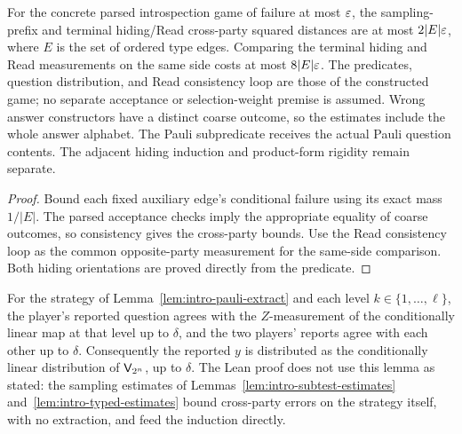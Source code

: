 \begin{lemma}
\label{lem:intro-typed-estimates}
\leanok
For the concrete parsed introspection game of failure at most $\varepsilon$, the
sampling-prefix and terminal hiding/Read cross-party squared distances are
at most $2|E|\varepsilon$, where $E$ is the set of ordered type edges. Comparing the
terminal hiding and Read measurements on the same side costs at most
$8|E|\varepsilon$. The predicates, question distribution, and Read consistency loop
are those of the constructed game; no separate acceptance or selection-weight
premise is assumed. Wrong answer constructors have a distinct coarse outcome,
so the estimates include the whole answer alphabet. The Pauli subpredicate
receives the actual Pauli question contents. The adjacent hiding induction
and product-form rigidity remain separate.
\end{lemma}
\begin{proof}
\leanok
Bound each fixed auxiliary edge's conditional failure using its exact mass
$1/|E|$. The parsed acceptance checks imply the appropriate equality of
coarse outcomes, so consistency gives the cross-party bounds. Use the Read
consistency loop as the common opposite-party measurement for the same-side
comparison. Both hiding orientations are proved directly from the predicate.
\end{proof}

\begin{lemma}
\label{lem:intro-sampling-test}
For the strategy of Lemma~\ref{lem:intro-pauli-extract} and each level
$k \in \{1, \ldots, \ell\}$, the player's reported question agrees with the $Z$-measurement
of the conditionally linear map at that level up to $\delta$, and the two players' reports
agree with each other up to $\delta$. Consequently the reported $y$ is distributed as the
conditionally linear distribution of $\mathsf{V}_{2^n}$, up to $\delta$.
The Lean proof does not use this lemma as stated: the sampling estimates of
Lemmas~\ref{lem:intro-subtest-estimates} and~\ref{lem:intro-typed-estimates} bound
cross-party errors on the strategy itself, with no extraction, and feed the induction
directly.
\end{lemma}

